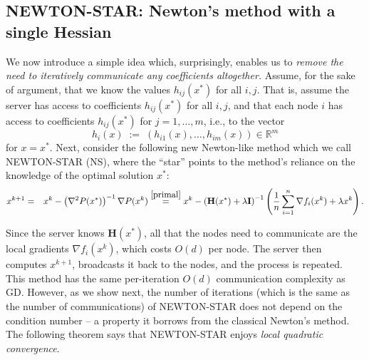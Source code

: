 \documentclass[10pt]{article}
\newcommand{\eqdef}{\; { := }\;}
\newcommand{\R}{\mathbb{R}}
\newcommand{\newalpha}{h}
\newcommand{\mH}{\mathbf{H}}
\newcommand{\mI}{\mathbf{I}}
\begin{document}
\subsection{{\sf NEWTON-STAR}: Newton's method with a single Hessian} \label{subsec:Newton-star}

We now introduce a simple idea which, surprisingly, enables us to {\em remove the need to iteratively communicate any coefficients altogether.}  Assume, for the sake of argument, that we know the values  $\newalpha_{ij}(x^*)$ for all $i,j$. That is, assume the server has access to coefficients $\newalpha_{ij}(x^*)$ for all $i,j$, and that each node $i$ has access to coefficients $\newalpha_{ij}(x^*)$  for $j=1,\dots,m$, i.e., to the vector
\begin{equation}\label{eq:8f0d8hfd}\newalpha_{i}(x) \eqdef (\newalpha_{i1}(x),\dots, \newalpha_{im}(x)) \in \R^m\end{equation}
for $x=x^*$.  Next, consider the following new Newton-like method which we call {\sf NEWTON-STAR (NS)}, where the ``star'' points to the method's reliance on the knowledge of the optimal solution $x^*$:
\begin{eqnarray}  x^{k+1} &=& x^k - \left(\nabla^2 P(x^*) \right)^{-1} \nabla P(x^k) 
\overset{\eqref{primal}}{=} x^k - \left(\mH(x^*) +\lambda \mI \right)^{-1} \left(\frac{1}{n}\sum_{i=1}^n \nabla f_i(x^k) + \lambda x^k\right).\label{eq:Newton-star}\end{eqnarray}

Since the server knows $\mH(x^*)$, all that the nodes need to communicate are the local gradients $\nabla f_i(x^k)$, which costs $O(d)$ per node. The server then computes $x^{k+1}$, broadcasts it back to the nodes, and the process is repeated. This method has the same per-iteration $O(d)$ communication complexity as GD. However, as we show next, the number of iterations (which is the same as the number of communications) of {\sf NEWTON-STAR} does not depend on the condition number -- a property it borrows from the classical Newton's method. The following theorem says that {\sf NEWTON-STAR} enjoys {\em local quadratic convergence}.
\end{document}
